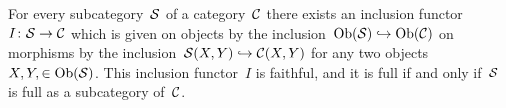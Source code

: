 \begin{example*}
  For every subcategory~$\mathcal{S}$ of a category~$\mathcal{C}$ there exists an inclusion functor~$I \colon \mathcal{S} \to \mathcal{C}$ which is given on objects by the inclusion~$\operatorname{Ob}(\mathcal{S}) \hookrightarrow \operatorname{Ob}(\mathcal{C})$ on morphisms by the inclusion~$\mathcal{S}(X,Y) \hookrightarrow \mathcal{C}(X,Y)$ for any two objects~$X, Y, \in \operatorname{Ob}(\mathcal{S})$.
  This inclusion functor~$I$ is faithful, and it is full if and only if~$\mathcal{S}$ is full as a subcategory of~$\mathcal{C}$.
\end{example*}




